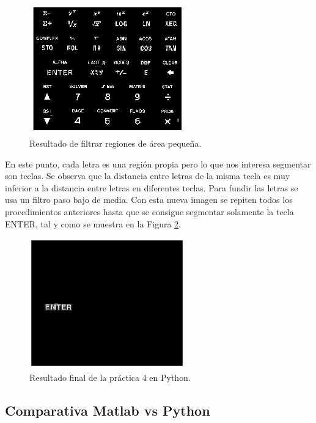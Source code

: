 \documentclass[a4paper,12pt]{report}
\begin{document}
\begin{figure}[h]
\centering
\includegraphics[width=0.6\textwidth]{imagenes/filtersmallareas}
\caption{Resultado de filtrar regiones de área pequeña.}
\label{filtersmallareas}
\end{figure}

En este punto, cada letra es una región propia pero lo que nos interesa segmentar son teclas. Se observa que la distancia entre letras de la misma tecla es muy inferior a la distancia entre letras en diferentes teclas. Para fundir las letras se usa un filtro paso bajo de media. Con esta nueva imagen se repiten todos los procedimientos anteriores hasta que se consigue segmentar solamente la tecla ENTER, tal y como se muestra en la  Figura \ref{finp4}.

\begin{figure}[h]
\centering
\includegraphics[width=0.6\textwidth]{imagenes/finp4}
\caption{Resultado final de la práctica 4 en Python.}
\label{finp4}
\end{figure}


\subsection{Comparativa Matlab vs Python}
\end{document}

